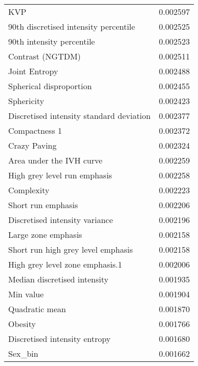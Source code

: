 \begin{longtable}{|lr|}
KVP                                                &        0.002597 \\
90th discretised intensity percentile              &        0.002525 \\
90th intensity percentile                          &        0.002523 \\
Contrast (NGTDM)                                   &        0.002511 \\
Joint Entropy                                      &        0.002488 \\
Spherical disproportion                            &        0.002455 \\
Sphericity                                         &        0.002423 \\
Discretised intensity standard deviation           &        0.002377 \\
Compactness 1                                      &        0.002372 \\
Crazy Paving                                       &        0.002324 \\
Area under the IVH curve                           &        0.002259 \\
High grey level run emphasis                       &        0.002258 \\
Complexity                                         &        0.002223 \\
Short run emphasis                                 &        0.002206 \\
Discretised intensity variance                     &        0.002196 \\
Large zone emphasis                                &        0.002158 \\
Short run high grey level emphasis                 &        0.002158 \\
High grey level zone emphasis.1                    &        0.002006 \\
Median discretised intensity                       &        0.001935 \\
Min value                                          &        0.001904 \\
Quadratic mean                                     &        0.001870 \\
Obesity                                            &        0.001766 \\
Discretised intensity entropy                      &        0.001680 \\
Sex\_bin                                            &        0.001662 \\

\end{longtable}

